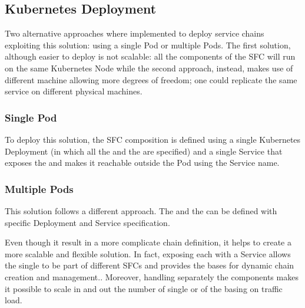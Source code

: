 \subsection{Kubernetes Deployment}
Two alternative approaches where implemented to deploy service chains exploiting
this
solution: using a single Pod or multiple Pods. The first solution, although
easier
to deploy is not scalable: all the components of the SFC will run on the same
Kubernetes Node while the second approach, instead, makes use of
different machine allowing more degrees of freedom; one could replicate the same
service on different physical machines.

\subsubsection*{Single Pod}
To deploy this solution, the SFC composition is
defined using a single Kubernetes Deployment (in which all the \vnf{} and
the \enchainer{} are specified) and a single Service that exposes the
\enchainer{} and makes it reachable outside the Pod using the Service name.

\subsubsection*{Multiple Pods}
This solution follows a different approach. The \enchainer{} and the \vnfs{} can
be defined with specific Deployment and Service specification.

Even though it result in a more complicate chain definition, it helps to create
a more scalable and flexible solution. In fact, exposing each \vnf{} with a
Service allows the single \vnf{} to be part of different SFCs and provides the
bases for dynamic chain creation and management.. Moreover, handling separately
the components makes it possible to scale in and out the number of single
\vnfs{} or of the \enchainer{} basing on traffic load.

